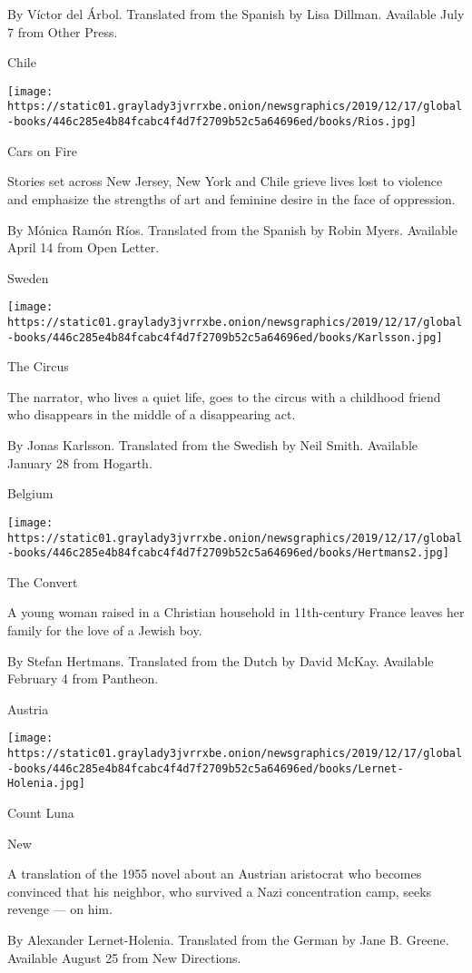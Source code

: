  By Víctor del Árbol. Translated from the Spanish by Lisa Dillman.
Available July 7 from Other Press.

Chile

\texttt{[image: https://static01.graylady3jvrrxbe.onion/newsgraphics/2019/12/17/global-books/446c285e4b84fcabc4f4d7f2709b52c5a64696ed/books/Rios.jpg]}

Cars on Fire

Stories set across New Jersey, New York and Chile grieve lives lost to
violence and emphasize the strengths of art and feminine desire in the
face of oppression.

 By Mónica Ramón Ríos. Translated from the Spanish by Robin Myers.
Available April 14 from Open Letter.

Sweden

\texttt{[image: https://static01.graylady3jvrrxbe.onion/newsgraphics/2019/12/17/global-books/446c285e4b84fcabc4f4d7f2709b52c5a64696ed/books/Karlsson.jpg]}

The Circus

The narrator, who lives a quiet life, goes to the circus with a
childhood friend who disappears in the middle of a disappearing act.

 By Jonas Karlsson. Translated from the Swedish by Neil Smith. Available
January 28 from Hogarth.

Belgium

\texttt{[image: https://static01.graylady3jvrrxbe.onion/newsgraphics/2019/12/17/global-books/446c285e4b84fcabc4f4d7f2709b52c5a64696ed/books/Hertmans2.jpg]}

The Convert

A young woman raised in a Christian household in 11th-century France
leaves her family for the love of a Jewish boy.

 By Stefan Hertmans. Translated from the Dutch by David McKay. Available
February 4 from Pantheon.

Austria

\texttt{[image: https://static01.graylady3jvrrxbe.onion/newsgraphics/2019/12/17/global-books/446c285e4b84fcabc4f4d7f2709b52c5a64696ed/books/Lernet-Holenia.jpg]}

Count Luna

New

A translation of the 1955 novel about an Austrian aristocrat who becomes
convinced that his neighbor, who survived a Nazi concentration camp,
seeks revenge --- on him.

 By Alexander Lernet-Holenia. Translated from the German by Jane B.
Greene. Available August 25 from New Directions.

